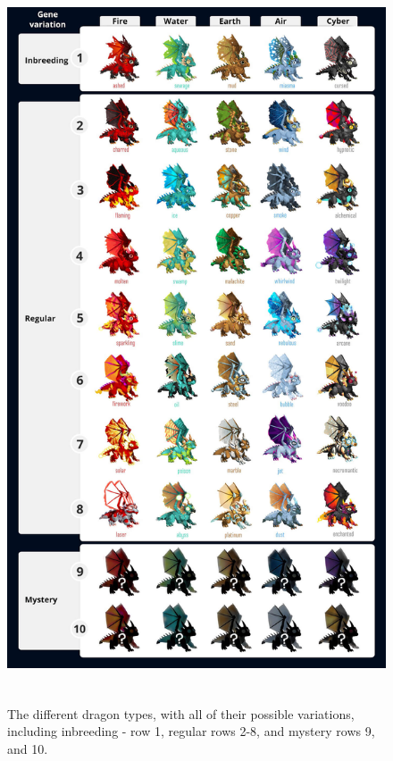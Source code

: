 \documentclass[12pt]{article}
\begin{document}
\begin{Center}

\begin{figure}[!ht]
	\begin{Center}
		\includegraphics[width=4.85in,height=8.48in]{./media/image14.jpg}
		\caption{The different dragon types, with all of their possible variations, including inbreeding - row 1, regular rows 2-8, and mystery rows 9, and 10.}
		\label{fig:The_different_dragon_types_with_all_of_their_possible_variations_including_inbreeding_row_1_regular_rows_28_and_mystery_rows_9_and_10}
	\end{Center}
\end{figure}





\end{Center}\par
\end{document}
